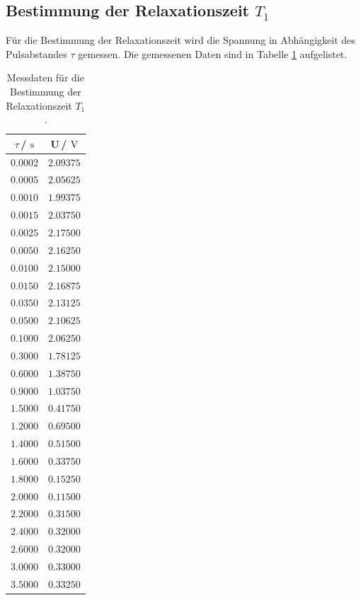 \subsection{Bestimmung der Relaxationszeit $T_{\text{1}}$}
Für die Bestimmung der Relaxationszeit wird die Spannung in Abhängigkeit des Pulsabstandes $\tau$ gemessen.
Die gemessenen Daten sind in Tabelle \ref{tab:T1_Data} aufgelistet.
\begin{table}
  \centering
  \caption{Messdaten für die Bestimmung der Relaxationszeit $T_{\text{1}}$.}
  \label{tab:T1_Data}
  \begin{tabular}{c c}
    \toprule
    $\tau$\,/\,$\SI{}{\second}$&U\,/\,$\SI{}{\volt}$\\
    \midrule
    $\num{0.0002}$&$\num{2.09375}$\\
    $\num{0.0005}$&$\num{2.05625}$\\
    $\num{0.0010}$&$\num{1.99375}$\\
    $\num{0.0015}$&$\num{2.03750}$\\
    $\num{0.0025}$&$\num{2.17500}$\\
    $\num{0.0050}$&$\num{2.16250}$\\
    $\num{0.0100}$&$\num{2.15000}$\\
    $\num{0.0150}$&$\num{2.16875}$\\
    $\num{0.0350}$&$\num{2.13125}$\\
    $\num{0.0500}$&$\num{2.10625}$\\
    $\num{0.1000}$&$\num{2.06250}$\\
    $\num{0.3000}$&$\num{1.78125}$\\
    $\num{0.6000}$&$\num{1.38750}$\\
    $\num{0.9000}$&$\num{1.03750}$\\
    $\num{1.5000}$&$\num{0.41750}$\\
    $\num{1.2000}$&$\num{0.69500}$\\
    $\num{1.4000}$&$\num{0.51500}$\\
    $\num{1.6000}$&$\num{0.33750}$\\
    $\num{1.8000}$&$\num{0.15250}$\\
    $\num{2.0000}$&$\num{0.11500}$\\
    $\num{2.2000}$&$\num{0.31500}$\\
    $\num{2.4000}$&$\num{0.32000}$\\
    $\num{2.6000}$&$\num{0.32000}$\\
    $\num{3.0000}$&$\num{0.33000}$\\
    $\num{3.5000}$&$\num{0.33250}$\\
    \bottomrule
  \end{tabular}
\end{table}
